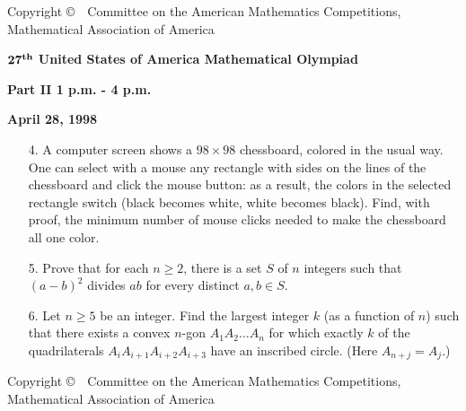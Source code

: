 \documentclass[12pt]{article}
\begin{document}
{\small
\begin{center}
Copyright \copyright \ \ Committee on the American  Mathematics  Competitions,\\
Mathematical Association of America
\end{center}
}
\newpage

\begin{center}
${\bf 27^{th}}$ {\bf United States of America Mathematical Olympiad}
\end{center}



\begin{center}
{\bf  Part  II \hspace{ 6mm} 1 p.m. - 4 p.m.}
\end{center}


\begin{center}
{\bf April 28, 1998}
\end{center}

\bigskip

\begin{itemize}

 


\item[4.]A computer screen shows a $98 \times 98$ chessboard,
 colored in the usual
 way.
One can select with a mouse any rectangle with sides on the lines of the
chessboard
and click the mouse button: as a result,  the colors in the selected
rectangle switch
(black becomes white, white becomes black). Find, with proof, the minimum
number of mouse clicks needed to make the chessboard all one color.



\item[5.] Prove that for each $n\geq 2$, there is a set $S$ of
$n$ integers such that $(a-b)^2$ divides $ab$ for every distinct
$a,b\in S$. 

\item[6.] Let $n \geq 5$ be an integer. Find the largest integer $k$ (as a
function of $n$) such that there exists a convex $n$-gon
$A_{1}A_{2}\dots A_{n}$ for which exactly $k$ of the
quadrilaterals $A_{i}A_{i+1}A_{i+2}A_{i+3}$ have an inscribed circle.
(Here $A_{n+j} = A_{j}$.)

\end{itemize}

\vspace{130mm}
{\small
\begin{center}
Copyright \copyright \ \  Committee on the American  Mathematics  Competitions,\\
Mathematical Association of America
\end{center}
}
\end{document}
